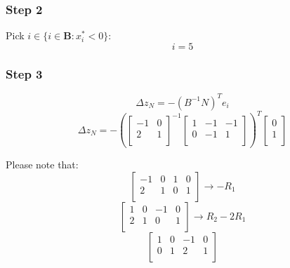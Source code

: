 \documentclass[14pt]{extarticle}
\begin{document}
\subsubsection*{Step 2}
Pick $i \in \{i \in \boldsymbol{B}: x^*_i < 0\}$:
\[
    i = 5
\]

\subsubsection*{Step 3}
\[
    \Delta z_N = -(B^{-1}N)^T e_i
\]
\[
    \Delta z_N = -\left(\begin{bmatrix}
        -1 & 0 \\
        2 & 1 \\
    \end{bmatrix}^{-1}
    \begin{bmatrix}
        1 & -1 & -1 \\
        0 & -1 & 1 \\
    \end{bmatrix}\right)^T
    \begin{bmatrix}
        0 \\
        1 \\
    \end{bmatrix}
\]

\bigskip Please note that:
\[
    \left[
    \begin{array}{cc|cc}
        -1 & 0 & 1 & 0 \\
        2 & 1 & 0 & 1 \\
    \end{array}
    \right] \to -R_1
\]
\[
    \left[
    \begin{array}{cc|cc}
        1 & 0 & -1 & 0 \\
        2 & 1 & 0 & 1 \\
    \end{array}
    \right] \to R_2 - 2R_1
\]
\[
    \left[
    \begin{array}{cc|cc}
        1 & 0 & -1 & 0 \\
        0 & 1 & 2 & 1 \\
    \end{array}
    \right]
\]
\end{document}

